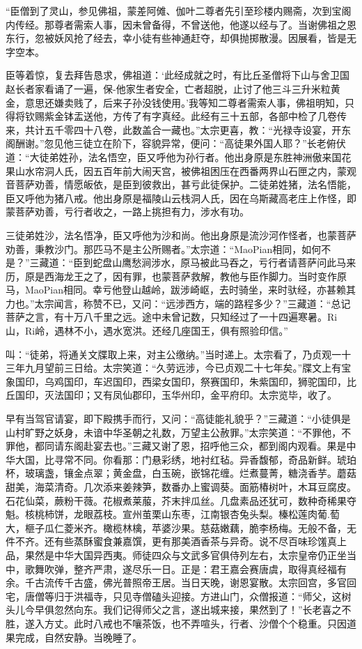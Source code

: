 \documentclass[12pt,UTF8]{ctexbook}
\begin{document}
{	“臣僧到了灵山，参见佛祖，蒙差阿傩、伽叶二尊者先引至珍楼内赐斋，次到宝阁内传经。那尊者需索人事，因未曾备得，不曾送他，他遂以经与了。当谢佛祖之恩东行，忽被妖风抢了经去，幸小徒有些神通赶夺，却俱抛掷散漫。因展看，皆是无字空本。
	
	臣等着惊，复去拜告恳求，佛祖道：‘此经成就之时，有比丘圣僧将下山与舍卫国赵长者家看诵了一遍，保-他家生者安全，亡者超脱，止讨了他三斗三升米粒黄金，意思还嫌卖贱了，后来子孙没钱使用。’我等知二尊者需索人事，佛祖明知，只得将钦赐紫金钵盂送他，方传了有字真经。此经有三十五部，各部中检了几卷传来，共计五千零四十八卷，此数盖合一藏也。”太宗更喜，教：“光禄寺设宴，开东阁酬谢。”忽见他三徒立在阶下，容貌异常，便问：“高徒果外国人耶？”长老俯伏道：“大徒弟姓孙，法名悟空，臣又呼他为孙行者。他出身原是东胜神洲傲来国花果山水帘洞人氏，因五百年前大闹天宫，被佛祖困压在西番两界山石匣之内，蒙观音菩萨劝善，情愿皈依，是臣到彼救出，甚亏此徒保护。二徒弟姓猪，法名悟能，臣又呼他为猪八戒。他出身原是福陵山云栈洞人氏，因在乌斯藏高老庄上作怪，即蒙菩萨劝善，亏行者收之，一路上挑担有力，涉水有功。
	
	三徒弟姓沙，法名悟净，臣又呼他为沙和尚。他出身原是流沙河作怪者，也蒙菩萨劝善，秉教沙门。那匹马不是主公所赐者。”太宗道：“MaoPian相同，如何不是？”三藏道：“臣到蛇盘山鹰愁涧涉水，原马被此马吞之，亏行者请菩萨问此马来历，原是西海龙王之了，因有罪，也蒙菩萨救解，教他与臣作脚力。当时变作原马，MaoPian相同。幸亏他登山越岭，跋涉崎岖，去时骑坐，来时驮经，亦甚赖其力也。”太宗闻言，称赞不已，又问：“远涉西方，端的路程多少？”三藏道：“总记菩萨之言，有十万八千里之远。途中未曾记数，只知经过了一十四遍寒暑。Ri山，Ri岭，遇林不小，遇水宽洪。还经几座国王，俱有照验印信。”
	
	叫：“徒弟，将通关文牒取上来，对主公缴纳。”当时递上。太宗看了，乃贞观一十三年九月望前三日给。太宗笑道：“久劳远涉，今已贞观二十七年矣。”牒文上有宝象国印，乌鸡国印，车迟国印，西梁女国印，祭赛国印，朱紫国印，狮驼国印，比丘国印，灭法国印；又有凤仙郡印，玉华州印，金平府印。太宗览毕，收了。
	
	早有当驾官请宴，即下殿携手而行，又问：“高徒能礼貌乎？”三藏道：“小徒俱是山村旷野之妖身，未谙中华圣朝之礼数，万望主公赦罪。”太宗笑道：“不罪他，不罪他，都同请东阁赴宴去也。”三藏又谢了恩，招呼他三众，都到阁内观看。果是中华大国，比寻常不同。你看那：门悬彩绣，地衬红毡。异香馥郁，奇品新鲜。琥珀杯，玻璃盏，镶金点翠；黄金盘，白玉碗，嵌锦花缠。烂煮蔓菁，糖浇香芋。蘑菇甜美，海菜清奇。几次添来姜辣笋，数番办上蜜调葵。面筋椿树叶，木耳豆腐皮。石花仙菜，蕨粉干薇。花椒煮莱菔，芥末拌瓜丝。几盘素品还犹可，数种奇稀果夺魁。核桃柿饼，龙眼荔枝。宣州茧栗山东枣，江南银杏兔头梨。榛松莲肉葡.萄大，榧子瓜仁菱米齐。橄榄林檎，苹婆沙果。慈菇嫩藕，脆李杨梅。无般不备，无件不齐。还有些蒸酥蜜食兼嘉馔，更有那美酒香茶与异奇。说不尽百味珍馐真上品，果然是中华大国异西夷。师徒四众与文武多官俱侍列左右，太宗皇帝仍正坐当中，歌舞吹弹，整齐严肃，遂尽乐一日。正是：君王嘉会赛唐虞，取得真经福有余。千古流传千古盛，佛光普照帝王居。当日天晚，谢恩宴散。太宗回宫，多官回宅，唐僧等归于洪福寺，只见寺僧磕头迎接。方进山门，众僧报道：“师父，这树头儿今早俱忽然向东。我们记得师父之言，遂出城来接，果然到了！”长老喜之不胜，遂入方丈。此时八戒也不嚷茶饭，也不弄喧头，行者、沙僧个个稳重。只因道果完成，自然安静。当晚睡了。
	
}
\end{document}
